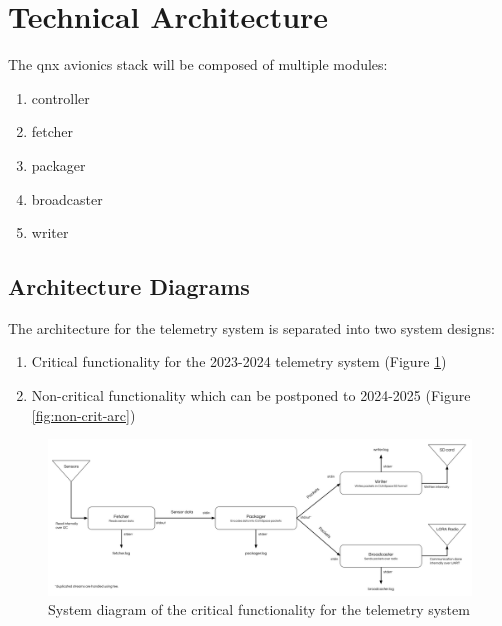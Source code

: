 \section{Technical Architecture} \label{s:tech-arch}

The \gls{qnx} avionics stack will be composed of multiple modules:

\begin{enumerate}
    \setlength{\itemsep}{1pt}
    \setlength{\parskip}{0pt} \setlength{\parsep}{0pt}
    \item controller
    \item fetcher
    \item packager
    \item broadcaster
    \item writer
\end{enumerate}

\subsection{Architecture Diagrams}

The architecture for the  telemetry system is separated into two system designs:
\begin{enumerate}
    \setlength{\itemsep}{1pt}
    \setlength{\parskip}{0pt} \setlength{\parsep}{0pt}
    \item Critical functionality for the 2023-2024 telemetry system (Figure \ref{fig:crit-arc})
    \item Non-critical functionality which can be postponed to 2024-2025 (Figure \ref{fig:non-crit-arc})
\end{enumerate}

\begin{figure}[H]
    \includegraphics[width=\linewidth]{assets/critical-architecture.png}
    \caption{System diagram of the critical functionality for the telemetry system}
    \label{fig:crit-arc}
\end{figure}

